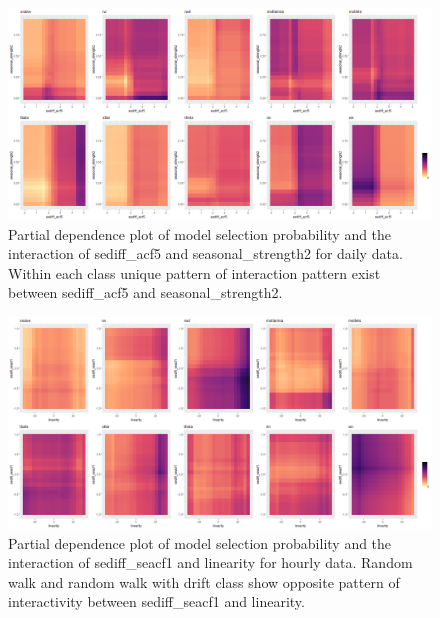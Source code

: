 \documentclass[11pt,a4paper,]{article}
\begin{document}
\begin{figure}
\centering
\includegraphics{figures/dtwopdp-1.png}
\caption{\label{fig:dtwopdp}Partial dependence plot of model selection
probability and the interaction of sediff\_acf5 and seasonal\_strength2
for daily data. Within each class unique pattern of interaction pattern
exist between sediff\_acf5 and seasonal\_strength2.}
\end{figure}

\begin{figure}
\centering
\includegraphics{figures/htwopdp-1.png}
\caption{\label{fig:htwopdp}Partial dependence plot of model selection
probability and the interaction of sediff\_seacf1 and linearity for
hourly data. Random walk and random walk with drift class show opposite
pattern of interactivity between sediff\_seacf1 and linearity.}
\end{figure}

\clearpage
\end{document}
